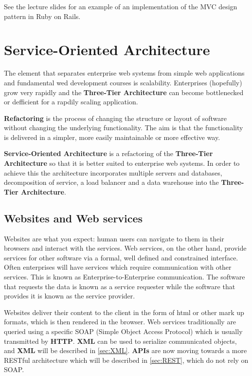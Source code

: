 \documentclass[11pt]{article}
\begin{document}
See the lecture slides for an example of an implementation of the MVC design pattern in Ruby on Rails.




\section{Service-Oriented Architecture}
\label{sec:SOA}

The element that separates enterprise web systems from simple web applications and fundamental wed development courses is scalability. Enterprises (hopefully) grow very rapidly and the \textbf{Three-Tier Architecture} can become bottlenecked or defficient for a rapdily scaling application.

\textbf{Refactoring} is the process of changing the structure or layout of software without changing the underlying functionality. The aim is that the functionality is delivered in a simpler, more easily maintainable or more effective way.

\textbf{Service-Oriented Architecture} is a refactoring of the \textbf{Three-Tier Architecture} so that it is better suited to enterprise web systems. In order to achieve this the architecture incorporates multiple servers and databases, decomposition of service, a load balancer and a data warehouse into the \textbf{Three-Tier Architecture}.

\subsection{Websites and Web services}

Websites are what you expect: human users can navigate to them in their browsers and interact with the services. Web services, on the other hand, provide services for other software via a formal, well defined and constrained interface. Often enterprises will have services which require communication with other services. This is known as Enterprise-to-Enterprise communication. The software that requests the data is known as a service requester while the software that provides it is known as the service provider.

Websites deliver their content to the client in the form of html or other mark up formats, which is then rendered in the browser. Web services traditionally are queried using a specific SOAP (Simple Object Access Protocol) which is usually transmitted by \textbf{HTTP}. \textbf{XML }can be used to serialize communicated objects, and \textbf{XML} will be described in \ref{sec:XML}. \textbf{APIs} are now moving towards a more RESTful architecture which will be described in \ref{sec:REST}, which do not rely on SOAP.
\end{document}
